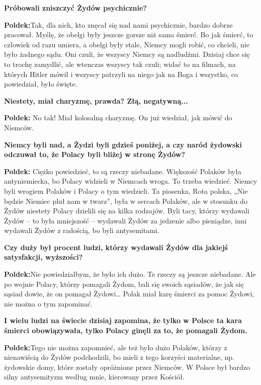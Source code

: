 \textbf{Próbowali zniszczyć Żydów psychicznie?}\par  
\textbf{Poldek:}Tak, dla nich, kto znęcał się nad nami psychicznie, bardzo dobrze pracował. Myślę, że obelgi były jeszcze gorsze niż sama śmierć. Bo jak śmierć, to człowiek od razu umiera, a obelgi były stale, Niemcy mogli robić, co chcieli, nie było żadnego sądu. Oni czuli, że wszyscy Niemcy są nadludźmi. Dzisiaj chce się to trochę zamydlić, ale wtenczas wszyscy tak czuli; widać to na filmach, na których Hitler mówił i wszyscy patrzyli na niego jak na Boga i wszystko, co powiedział, było święte.\par  
\textbf{Niestety, miał charyzmę, prawda? Złą, negatywną...}\par
\textbf{Poldek:} No tak! Miał kolosalną charyzmę. On już wiedział, jak mówić do Niemców.\par
\textbf{Niemcy byli nad, a Żydzi byli gdzieś poniżej, a czy naród żydowski odczuwał to, że Polacy byli bliżej w stronę Żydów?}\par  
\textbf{Poldek:} Ciężko powiedzieć, to są rzeczy niebadane. Większość Polaków była antyniemiecka, bo Polacy widzieli w Niemcach wroga. To trzeba wiedzieć. Niemcy byli wrogiem Polaków i Polacy o tym wiedzieli. Ta piosenka, Rota polska, „Nie będzie Niemiec pluł nam w twarz”, była w sercach Polaków, ale w stosunku do Żydów niestety Polacy dzielili się na kilka rodzajów. Byli tacy, którzy wydawali Żydów – to była mniejszość – wydawali Żydów za jedzenie albo pieniądze, inni wydawali Żydów z radością, bo byli antysemitami.\par 
\textbf{Czy duży był procent ludzi, którzy wydawali Żydów dla jakiejś satysfakcji, wyższości?}\par   
\textbf{Poldek:}Nie powiedziałbym, że było ich dużo. Te rzeczy są jeszcze niebadane. Ale po wojnie Polacy, którzy pomagali Żydom, bali się swoich sąsiadów, że jak się sąsiad dowie, że on pomagał Żydowi… Polak miał karę śmierci za pomoc Żydowi, nie można o tym zapominać.\par
\textbf{I wielu ludzi na świecie dzisiaj zapomina, że tylko w Polsce ta kara śmierci obowiązywała, tylko Polacy ginęli za to, że pomagali Żydom.}\par
\textbf{Poldek:}Tego nie można zapomnieć, ale też było dużo Polaków, którzy z nienawiścią do Żydów podchodzili, bo mieli z tego korzyści materialne, np. żydowskie domy, które zostały opróżnione przez Niemców. W Polsce był bardzo silny antysemityzm według mnie, kierowany przez Kościół.\par   

